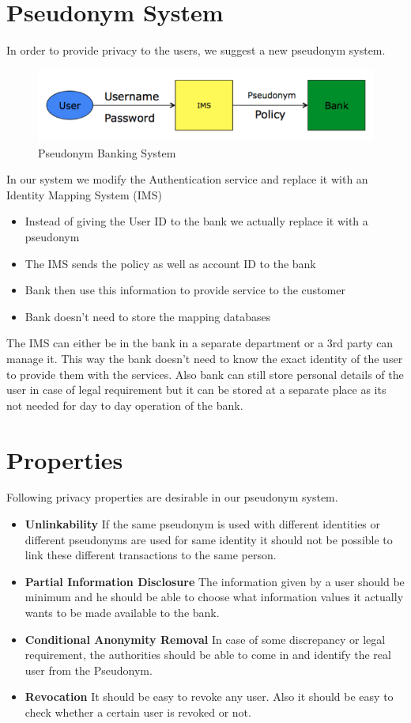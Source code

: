 \section{Pseudonym System}
In order to provide privacy to the users, we suggest a new pseudonym system.
\begin{figure}[h]
\centering
\includegraphics[width=\textwidth]{figures/Pseudonym}
\caption{Pseudonym Banking System}
\label{fig:Pseudonym}
\end{figure}
In our system we modify the Authentication service and replace it with an Identity Mapping System (IMS)
\begin{itemize}
	\item Instead of giving the User ID to the bank we actually replace it with a pseudonym
	\item The IMS sends the policy as well as account ID to the bank	
	\item Bank then use this information to provide service to the customer
	\item Bank doesn’t need to store the mapping databases
\end{itemize}
The IMS can either be in the bank in a separate department or a 3rd party can manage it. This way the bank doesn’t need to know the exact identity of the user to provide them with the services.
Also bank can still store personal details of the user in case of legal requirement but it can be stored at a separate place as its not needed for day to day operation of the bank.
\section{Properties}
Following privacy properties are desirable in our pseudonym system.
\begin{itemize}
	\item \textbf{Unlinkability} If the same pseudonym is used with different identities or different pseudonyms are used for same identity it should not be possible to link these different transactions to the same person. 
	\item \textbf{Partial Information Disclosure} The information given by a user should be minimum and he should be able to choose what information values it actually wants to be made available to the bank. 
	\item \textbf{Conditional Anonymity Removal} In case of some discrepancy or legal requirement, the authorities should be able to come in and identify the real user from the Pseudonym.
	\item \textbf{Revocation} It should be easy to revoke any user. Also it should be easy to check whether a certain user is revoked or not. 
\end{itemize}

